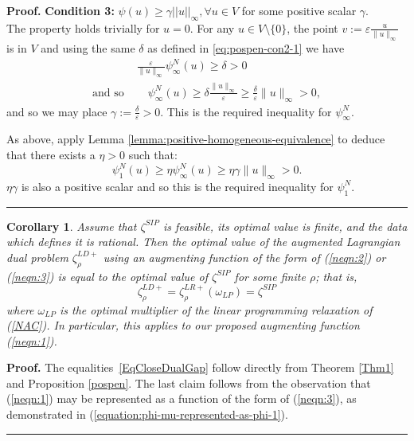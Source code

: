 \documentclass[preprint, 1p, review]{elsarticle}
\newtheorem{corollary}[theorem]{Corollary}
\newenvironment{proof}[1][Proof]{\noindent\textbf{#1.} }{\ \rule{0.5em}{0.5em}}
\begin{document}
\begin{proof}
	\textbf{Condition 3: } $\psi(u) \geq \gamma ||u||_\infty, \forall u \in V$ for some positive scalar $\gamma$.
	\\
	The property holds trivially for $u=0$. For any $u \in V \setminus \{0\}$,  the point $v := \varepsilon \frac{u}{\|u\|_{\infty}}$ is in $V$ and using the same $\delta$ as defined in \eqref{eq:pospen-con2-1} we have
	\begin{eqnarray*}
		&\frac{\varepsilon}{\|u\|_{\infty}}\psi_{\infty}^N (u) \geq \delta  >0 \\
		\text{and so } &\quad \psi_{\infty}^N (u) \geq \delta \frac{\|u\|_{\infty}}{\varepsilon} \geq \frac{\delta}{\varepsilon} \|u\|_{\infty}  >0,
	\end{eqnarray*}
	and so we may place $\gamma := \frac{\delta}{\varepsilon}>0$. This is the required inequality for  $\psi_{\infty}^N$.
	 
	As above, apply Lemma \ref{lemma:positive-homogeneous-equivalence} to deduce that there exists a $\eta > 0$ such that:
	$$\psi_{1}^N (u) \geq \eta \psi_{\infty}^N (u) \geq  \eta \gamma \| u \|_{\infty} >0. $$
	$\eta \gamma$ is also a positive scalar and so this is the required inequality for $\psi_{1}^N$.
\end{proof}

\begin{corollary}\label{pospen-corollary}
	Assume that $\zeta^{SIP}$ is feasible, its optimal value is finite, and the data which defines it is rational. Then the optimal value of the augmented Lagrangian dual problem $\zeta^{LD+}_\rho$ using an augmenting function of the form of (\ref{neqn:2}) or (\ref{neqn:3}) is equal to the optimal value of $\zeta^{SIP}$ for some finite $\rho$; that is,
	\begin{equation}\label{EqCloseDualGap}
	\zeta^{LD+}_\rho = \zeta^{LR+}_{\rho} (\omega_{LP}) = \zeta^{SIP}
	\end{equation}
	where $\omega_{LP}$ is the optimal multiplier of the linear programming relaxation of (\ref{NAC}). 
	In particular, this applies to our proposed augmenting function (\ref{neqn:1}).
\end{corollary}

\begin{proof}The equalities~\eqref{EqCloseDualGap} follow directly from Theorem \ref{Thm1} and Proposition \ref{pospen}. The last claim follows from the observation that (\ref{neqn:1}) may be represented as a function of the form of (\ref{neqn:3}), as demonstrated in (\ref{equation:phi-mu-represented-as-phi-1}).
\end{proof}
\end{document}
